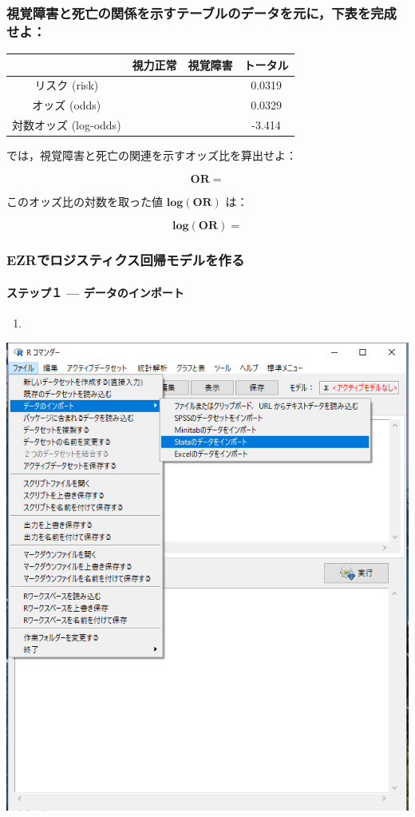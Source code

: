 \documentclass[11pt,]{problemset}
\let\oldparagraph\paragraph
\renewcommand{\paragraph}[1]{\oldparagraph{#1}\mbox{}}
\begin{document}
\vfill

\subsubsection{視覚障害と死亡の関係を示すテーブルのデータを元に，下表を完成せよ：}

\begin{center}
\begin{tabular}{|c|c|c|c|}
\hline
                 & 視力正常   & 視覚障害    & トータル   \\ \hline
リスク (risk)       &  &   & 0.0319 \\ \hline
オッズ (odds)       &  &   & 0.0329 \\ \hline
対数オッズ (log-odds) &  &  & -3.414 \\ \hline
\end{tabular}
\end{center}

\bigskip

では，視覚障害と死亡の関連を示すオッズ比を算出せよ：

\[
\mathbf{OR} = 
\]

このオッズ比の対数を取った値 \(\mathbf{log(OR)}\) は：

\[
\mathbf{log(OR)} = 
\]

\subsubsection{EZRでロジスティクス回帰モデルを作る}\label{ezr}

\paragraph{ステップ１ --- データのインポート}\label{-}

\begin{enumerate}
\def\labelenumi{\arabic{enumi}.}
\item
\end{enumerate}

\begin{center}\includegraphics[width=0.5\linewidth]{pic/import00} \end{center}
\end{document}
